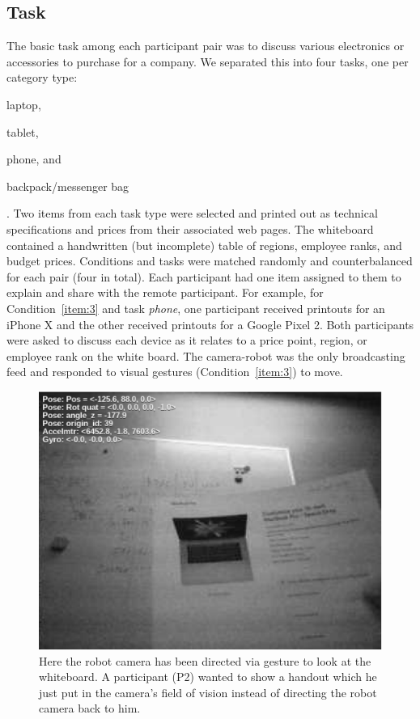 \documentclass{tufte-handout}
\begin{document}
\subsection{Task}
The basic task among each participant pair was to discuss various
electronics or accessories to purchase for a company.  We separated
this into four tasks, one per category type:
\begin{enumerate*}[label=(\alph*)]
\item laptop,
\item tablet,
\item phone, and
\item backpack/messenger bag
\end{enumerate*}. Two items from each task type were selected and
printed out as technical specifications and prices from their
associated web pages.  The whiteboard contained a handwritten (but
incomplete) table of regions, employee ranks, and budget prices.
Conditions and tasks were matched randomly and counterbalanced for
each pair (four in total). Each participant had one item assigned to
them to explain and share with the remote participant.  For example,
for Condition~\ref{item:3} and task \textit{phone}, one participant
received printouts for an iPhone X and the other received printouts
for a Google Pixel 2.  Both participants were asked to discuss each
device as it relates to a price point, region, or employee rank on the
white board.  The camera-robot was the only broadcasting feed and
responded to visual gestures (Condition~\ref{item:3}) to move.


\begin{figure}
  \centering
  \includegraphics[width=\columnwidth]{figures/insert-page}
  \caption{\label{fig:insertpage} Here the robot camera has been
    directed via gesture to look at the whiteboard.  A participant
    (P2) wanted to show a handout which he just put in the camera's
    field of vision instead of directing the robot camera back to
    him.}
\end{figure}
\end{document}
